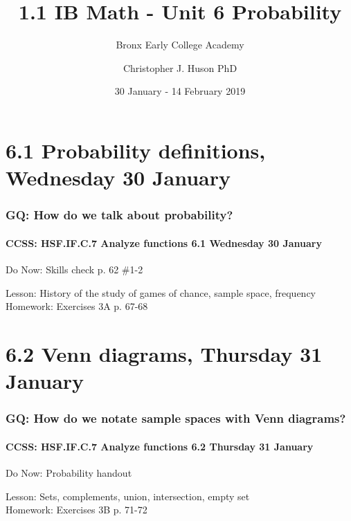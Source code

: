\documentclass{beamer}
\title{1.1 IB Math - Unit 6 Probability}
\subtitle{Bronx Early College Academy}
\author{Christopher J. Huson PhD}
\date{30 January - 14 February 2019}
\begin{document}
\frame{\titlepage}

\section[Outline]{}
\frame{\tableofcontents}

\section{6.1 Probability definitions, Wednesday 30 January}
  \frame
  {
    \frametitle{GQ: How do we talk about probability?}
    \framesubtitle{CCSS: HSF.IF.C.7 Analyze functions \hfill \alert{6.1 Wednesday 30 January}}

    \begin{block}{Do Now: Skills check p. 62 \#1-2}
    \end{block}
    Lesson: History of the study of games of chance, sample space, frequency \\ \bigskip
    Homework: Exercises 3A p. 67-68
  }


\section{6.2 Venn diagrams, Thursday 31 January}
  \frame
  {
    \frametitle{GQ: How do we notate sample spaces with Venn diagrams?}
    \framesubtitle{CCSS: HSF.IF.C.7 Analyze functions \hfill  \alert{6.2 Thursday 31 January}}

    \begin{block}{Do Now: Probability handout}
    \end{block}
    Lesson: Sets, complements, union, intersection, empty set \\ \bigskip
    Homework: Exercises 3B p. 71-72
  }
\end{document}
